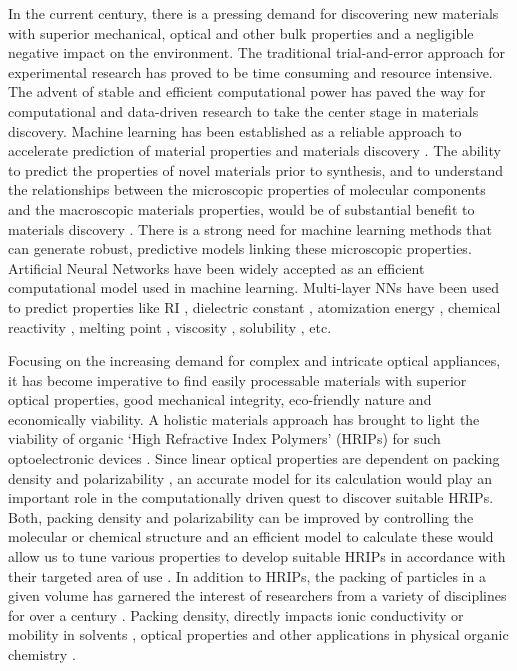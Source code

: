 In the current century, there is a pressing demand for discovering new materials with superior mechanical, optical and other bulk properties and a negligible negative impact on the environment. The traditional trial-and-error approach for experimental research has proved to be time consuming and resource intensive. The advent of stable and efficient computational power has paved the way for computational and data-driven research to take the center stage in materials discovery. Machine learning has been established as a reliable approach to accelerate prediction of material properties and materials discovery \cite{Olivares-Amaya2011}. The ability to predict the properties of novel materials prior to synthesis, and to understand the relationships between the microscopic properties of molecular components and the macroscopic materials properties, would be of substantial benefit to materials discovery \cite{Hachmann2014}. There is a strong need for machine learning methods that can generate robust, predictive models linking these microscopic properties. Artificial Neural Networks have been widely accepted as an efficient computational model used in machine learning. Multi-layer NNs have been used to predict properties like RI \cite{Alexandridis2012}, dielectric constant \cite{Mannodi-Kanakkithodi2016}, atomization energy \cite{Montavon2012}, chemical reactivity \cite{Simon1993}, melting point \cite{Karthikeyan2005}, viscosity \cite{Gharagheizi2007}, solubility \cite{Huuskonen1998}, etc.

Focusing on the increasing demand for complex and intricate optical appliances, it has become imperative to find easily processable materials with superior optical properties, good mechanical integrity, eco-friendly nature and economically viability. A holistic materials approach has brought to light the viability of organic ‘High Refractive Index Polymers’ (HRIPs) for such optoelectronic devices \cite{Higashihara2015,Macdonald2014}. Since linear optical properties are dependent on packing density and polarizability \cite{Terui2004}, an accurate model for its calculation would play an important role in the computationally driven quest to discover suitable HRIPs. Both, packing density and polarizability can be improved by controlling the molecular or chemical structure and an efficient model to calculate these would allow us to tune various properties to develop suitable HRIPs in accordance with their targeted area of use \cite{Tanio1994}. In addition to HRIPs, the packing of particles in a given volume has garnered the interest of researchers from a variety of disciplines for over a century \cite{Kwan2009}. Packing density, directly impacts ionic conductivity \cite{Swenson1996} or mobility in solvents \cite{Shen2015}, optical properties \cite{Ando2006,Terui2004} and other applications in physical organic chemistry \cite{Sheu1989}. 

